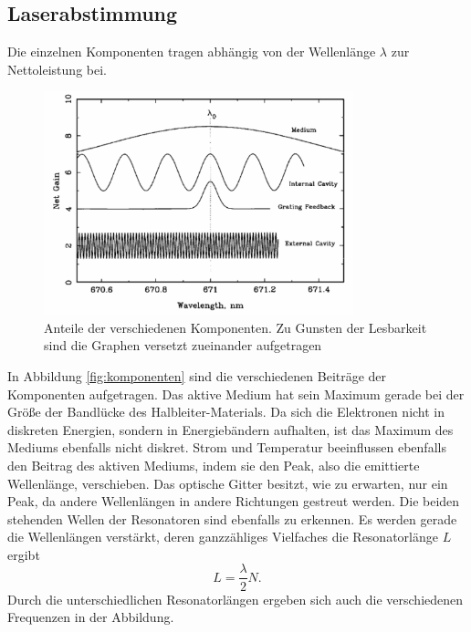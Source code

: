 \subsection{Laserabstimmung}
Die einzelnen Komponenten tragen abhängig von der Wellenlänge $\lambda$ zur Nettoleistung bei.
\begin{figure}[h]
    \centering
    \includegraphics[width=0.8\textwidth]{abb/Laserabstimmung.png}
    \caption{Anteile der verschiedenen Komponenten. Zu Gunsten der Lesbarkeit sind die Graphen versetzt zueinander aufgetragen \cite{laser}}
    \label{fig:komponenten}
\end{figure}
In Abbildung \eqref{fig:komponenten} sind die verschiedenen Beiträge der Komponenten aufgetragen.
Das aktive Medium hat sein Maximum gerade bei der Größe der Bandlücke des Halbleiter-Materials.
Da sich die Elektronen nicht in diskreten Energien,
sondern in Energiebändern aufhalten, ist das Maximum des Mediums ebenfalls nicht diskret.
Strom und Temperatur beeinflussen ebenfalls den Beitrag des aktiven Mediums,
indem sie den Peak, also die emittierte Wellenlänge, verschieben.
Das optische Gitter besitzt, 
wie zu erwarten,
nur ein Peak,
da andere Wellenlängen in andere Richtungen gestreut werden. 
Die beiden stehenden Wellen der Resonatoren sind ebenfalls zu erkennen.
Es werden gerade die Wellenlängen verstärkt,
deren ganzzähliges Vielfaches die Resonatorlänge $L$ ergibt
\begin{equation*}
    L = \frac{\lambda}{2}N.
\end{equation*} 
Durch die unterschiedlichen Resonatorlängen ergeben sich auch die verschiedenen Frequenzen in der Abbildung.

